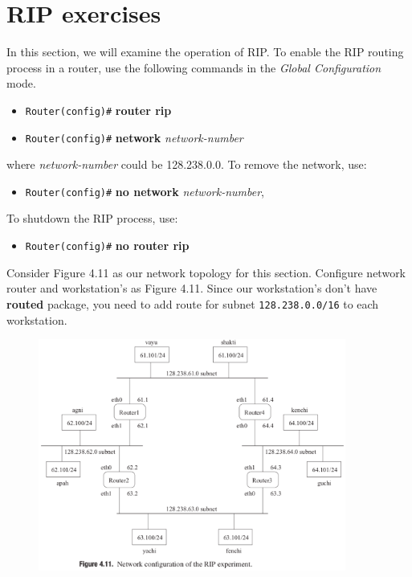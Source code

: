 \documentclass[10pt,a4paper]{article}
\numberwithin{equation}{section}
\numberwithin{figure}{section}
\numberwithin{table}{section}
\begin{document}
\section*{RIP exercises}
    In this section, we will examine the operation of RIP. To enable the RIP routing process in a router, use the following commands in the \textit{Global Configuration} mode.
    \begin{itemize}
        \item \texttt{Router(config)\#} \textbf{router rip}
        \item \texttt{Router(config)\#} \textbf{network} \textit{network-number}
    \end{itemize}
    where \textit{network-number} could be 128.238.0.0. To remove the network, use:
    \begin{itemize}
        \item \texttt{Router(config)\#} \textbf{no network} \textit{network-number},
    \end{itemize}
    To shutdown the RIP process, use:
    \begin{itemize}
        \item \texttt{Router(config)\#} \textbf{no router rip}
    \end{itemize}
    Consider Figure 4.11 as our network topology for this section.
    Configure network router and workstation’s as Figure 4.11. Since our workstation’s don’t have \textbf{routed} package, you need to add route for subnet \texttt{128.238.0.0/16} to each workstation.
    \begin{figure}[H]
        \centering
        \includegraphics[width=0.9\textwidth]{img/figure4-11.png}
    \end{figure}
\end{document}
